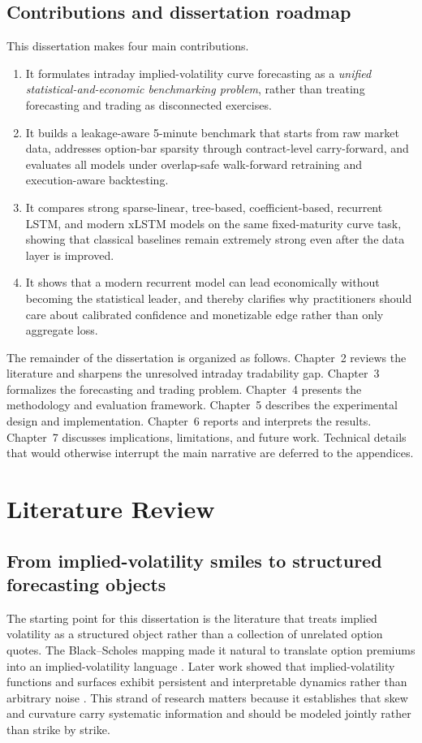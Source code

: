 \documentclass[12pt]{report}
\begin{document}
\section{Contributions and dissertation roadmap}
This dissertation makes four main contributions.
\begin{enumerate}[leftmargin=1.3cm]
    \item It formulates intraday implied-volatility curve forecasting as a \emph{unified statistical-and-economic benchmarking problem}, rather than treating forecasting and trading as disconnected exercises.
    \item It builds a leakage-aware 5-minute benchmark that starts from raw market data, addresses option-bar sparsity through contract-level carry-forward, and evaluates all models under overlap-safe walk-forward retraining and execution-aware backtesting.
    \item It compares strong sparse-linear, tree-based, coefficient-based, recurrent LSTM, and modern xLSTM models on the same fixed-maturity curve task, showing that classical baselines remain extremely strong even after the data layer is improved.
    \item It shows that a modern recurrent model can lead economically without becoming the statistical leader, and thereby clarifies why practitioners should care about calibrated confidence and monetizable edge rather than only aggregate loss.
\end{enumerate}

The remainder of the dissertation is organized as follows. Chapter~2 reviews the literature and sharpens the unresolved intraday tradability gap. Chapter~3 formalizes the forecasting and trading problem. Chapter~4 presents the methodology and evaluation framework. Chapter~5 describes the experimental design and implementation. Chapter~6 reports and interprets the results. Chapter~7 discusses implications, limitations, and future work. Technical details that would otherwise interrupt the main narrative are deferred to the appendices.

\chapter{Literature Review}

\section{From implied-volatility smiles to structured forecasting objects}
The starting point for this dissertation is the literature that treats implied volatility as a structured object rather than a collection of unrelated option quotes. The Black--Scholes mapping made it natural to translate option premiums into an implied-volatility language \citep{black1973}. Later work showed that implied-volatility functions and surfaces exhibit persistent and interpretable dynamics rather than arbitrary noise \citep{dumas1998,cont2002dynamics}. This strand of research matters because it establishes that skew and curvature carry systematic information and should be modeled jointly rather than strike by strike.
\end{document}
